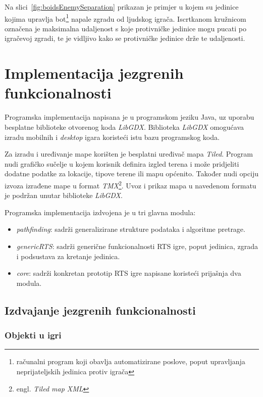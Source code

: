 \documentclass[times, utf8, zavrsni, numeric]{fer}
\begin{document}
\par Na slici~\ref{fig:boidsEnemySeparation} prikazan je primjer u kojem su jedinice kojima upravlja bot\footnote{računalni program koji obavlja automatizirane poslove, poput upravljanja neprijateljskih jedinica protiv igrača} napale zgradu od ljudskog igrača.
Iscrtkanom kružnicom označena je maksimalna udaljenost s koje protivničke jedinice mogu pucati po igračevoj zgradi, te je vidljivo kako se protivničke jedinice drže te udaljenosti.

\chapter{Implementacija jezgrenih funkcionalnosti}\label{ch:implementation}

\par Programska implementacija napisana je u programskom jeziku Java, uz uporabu besplatne biblioteke otvorenog koda \textit{LibGDX}.
Biblioteka \textit{LibGDX} omogućava izradu mobilnih i \textit{desktop} igara koristeći istu bazu programskog koda.

\par Za izradu i uređivanje mape korišten je besplatni uređivač mapa \textit{Tiled}.
Program nudi grafičko sučelje u kojem korisnik definira izgled terena i može pridjeliti dodatne podatke za lokacije, tipove terene ili mapu općenito.
Također nudi opciju izvoza izrađene mape u format \textit{TMX}\footnote{engl. \textit{Tiled map XML}}.
Uvoz i prikaz mapa u navedenom formatu je podržan unutar biblioteke \textit{LibGDX}.

\par Programska implementacija izdvojena je u tri glavna modula:
\begin{itemize}
	\item \textit{pathfinding}: sadrži generalizirane strukture podataka i algoritme pretrage.
	\item \textit{genericRTS}: sadrži generične funkcionalnosti RTS igre, poput jedinica, zgrada i podsustava za kretanje jedinica.
	\item \textit{core}: sadrži konkretan prototip RTS igre napisane koristeći prijašnja dva modula.
\end{itemize}

\section{Izdvajanje jezgrenih funkcionalnosti}

\subsection{Objekti u igri}
\end{document}
